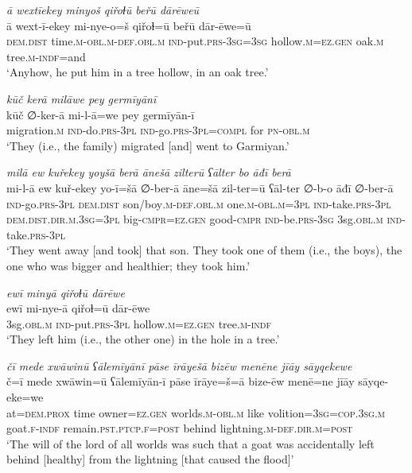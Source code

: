\ea \label{ZB.38}
\textit{ā wextīekey minyoš qiřoɫū beřū dārēweū} \\ 
\gll ā wext-ī-ekey mi-nye-o=š qiřoɫ=ū beřū dār-ēwe=ū \\ 
 \textsc{dem.dist} time\textsc{.m}\textsc{-obl}\textsc{.m}\textsc{-def}\textsc{.obl}\textsc{.m} \textsc{ind-}put\textsc{.prs}\textsc{-3sg}\textsc{=3sg} hollow\textsc{.m}\textsc{\textsc{=ez.gen}} oak\textsc{.m} tree\textsc{.m}\textsc{-indf}=and \\ 
\glt `Anyhow, he put him in a tree hollow, in an oak tree.'
\z 
 
\ea \label{ZB.39}
\textit{kūč kerā milāwe pey germīyānī} \\ 
\gll kūč ∅-ker-ā mi-l-ā=we pey germīyān-ī \\ 
 migration\textsc{.m} \textsc{ind-}do\textsc{.prs}\textsc{-3pl} \textsc{ind-}go\textsc{.prs}\textsc{-3pl}\textsc{=compl} for \textsc{pn}\textsc{-obl}\textsc{.m} \\ 
\glt `They (i.e., the family) migrated [and] went to Garmiyan.'
\z 
 
\ea \label{ZB.40}
\textit{milā ew kuřekey yoyšā berā ānešā zilterū ʕālter bo āđī berā} \\ 
\gll mi-l-ā ew kuř-ekey yo-ī=šā ∅-ber-ā āne=šā zil-ter=ū ʕāl-ter ∅-b-o āđī ∅-ber-ā \\ 
 \textsc{ind-}go\textsc{.prs}\textsc{-3pl} \textsc{dem.dist} son/boy\textsc{.m}\textsc{-def}\textsc{.obl}\textsc{.m} one\textsc{.m}\textsc{-obl}\textsc{.m}\textsc{=3pl} \textsc{ind-}take\textsc{.prs}\textsc{-3pl} \textsc{dem.dist}\textsc{.dir}\textsc{.m}\textsc{.3sg}\textsc{=3pl} big\textsc{-cmpr}\textsc{\textsc{=ez.gen}} good\textsc{-cmpr} \textsc{ind-}be\textsc{.prs}\textsc{-3sg} 3sg\textsc{.obl}\textsc{.m} \textsc{ind-}take\textsc{.prs}\textsc{-3pl} \\ 
\glt `They went away [and took] that son. They took one of them (i.e., the boys), the one who was bigger and healthier; they took him.'
\z 
 
\ea \label{ZB.41}
\textit{ewī minyā qiřoɫū dārēwe} \\ 
\gll ewī mi-nye-ā qiřoɫ=ū dār-ēwe \\ 
 3sg\textsc{.obl}\textsc{.m} \textsc{ind-}put\textsc{.prs}\textsc{-3pl} hollow\textsc{.m}\textsc{\textsc{=ez.gen}} tree\textsc{.m}\textsc{-indf} \\ 
\glt `They left him (i.e., the other one) in the hole in a tree.'
\z 
 
\ea \label{ZB.42}
\textit{čī mede xwāwinū ʕālemīyānī pāse īrāyešā bizēw menēne jīāy sāyqekewe} \\ 
\gll č=ī mede xwāwin=ū ʕālemīyān-ī pāse īrāye=š=ā bize-ēw menē=ne jīāy sāyqe-eke=we \\ 
 at=\textsc{dem.prox} time owner\textsc{\textsc{=ez.gen}} worlds\textsc{.m}\textsc{-obl}\textsc{.m} like volition\textsc{=3sg}\textsc{=cop}\textsc{.3sg}\textsc{.m} goat\textsc{.f}\textsc{-indf} remain\textsc{.pst}\textsc{.ptcp}\textsc{.f}\textsc{=\textsc{post}} behind lightning\textsc{.m}\textsc{-def}\textsc{.dir}\textsc{.m}\textsc{=\textsc{post}} \\ 
\glt `The will of the lord of all worlds was such that a goat was accidentally left behind [healthy] from the lightning [that caused the flood]'
\z 
 
